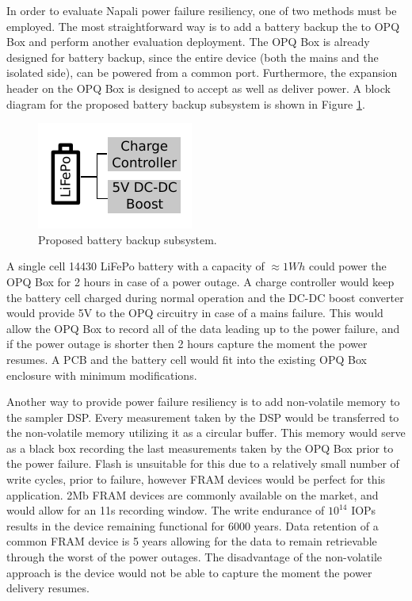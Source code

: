 In order to evaluate Napali power failure resiliency, one of two methods must be employed.
The most straightforward way is to add a battery backup the to OPQ Box and perform another evaluation deployment.
The OPQ Box is already designed for battery backup, since the entire device (both the mains and the isolated side), can be powered from a common port.
Furthermore, the expansion header on the OPQ Box is designed to accept as well as deliver power.
A block diagram for the proposed battery backup subsystem is shown in Figure \ref{fig:conc:bat}.
\begin{figure}[ht!]
    \centering
    \includegraphics[width=0.5\linewidth]{img/conclusions/battery.pdf}
    \caption{Proposed battery backup subsystem.}
    \label{fig:conc:bat}
\end{figure}
A single cell 14430 LiFePo battery with a capacity of $\approx 1Wh$ could power the OPQ Box for 2 hours in case of a power outage.
A charge controller would keep the battery cell charged during normal operation and the DC-DC boost converter would provide 5V to the OPQ circuitry in case of a mains failure.
This would allow the OPQ Box to record all of the data leading up to the power failure, and if the power outage is shorter then 2 hours capture the moment the power resumes.
A PCB and the battery cell would fit into the existing OPQ Box enclosure with minimum modifications.

Another way to provide power failure resiliency is to add non-volatile memory to the sampler DSP.
Every measurement taken by the DSP would be transferred to the non-volatile memory utilizing it as a circular buffer.
This memory would serve as a black box recording the last measurements taken by the OPQ Box prior to the power failure.
Flash is unsuitable for this due to a relatively small number of write cycles, prior to failure, however FRAM devices would be perfect for this application.
2Mb FRAM devices are commonly available on the market, and would allow for an 11s recording window.
The write endurance of $10^{14}$ IOPs results in the device remaining functional for 6000 years.
Data retention of a common FRAM device is 5 years allowing for the data to remain retrievable through the worst of the power outages.
The disadvantage of the non-volatile approach is the device would not be able to capture the moment the power delivery resumes.

